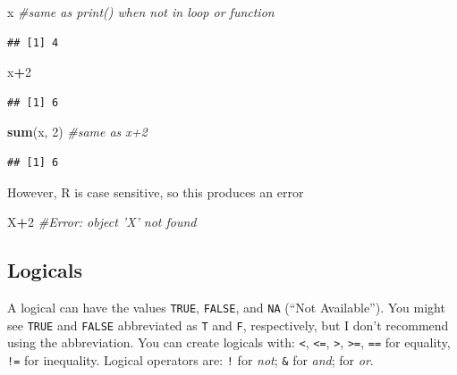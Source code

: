 \documentclass[]{article}
\newenvironment{Shaded}{\begin{snugshade}}{\end{snugshade}}
\newcommand{\KeywordTok}[1]{\textcolor[rgb]{0.13,0.29,0.53}{\textbf{#1}}}
\newcommand{\DecValTok}[1]{\textcolor[rgb]{0.00,0.00,0.81}{#1}}
\newcommand{\CommentTok}[1]{\textcolor[rgb]{0.56,0.35,0.01}{\textit{#1}}}
\newcommand{\OperatorTok}[1]{\textcolor[rgb]{0.81,0.36,0.00}{\textbf{#1}}}
\newcommand{\NormalTok}[1]{#1}
\begin{document}
\begin{Shaded}
\begin{Highlighting}[]
\NormalTok{x }\CommentTok{#same as print() when not in loop or function}
\end{Highlighting}
\end{Shaded}

\begin{verbatim}
## [1] 4
\end{verbatim}

\begin{Shaded}
\begin{Highlighting}[]
\NormalTok{x}\OperatorTok{+}\DecValTok{2}
\end{Highlighting}
\end{Shaded}

\begin{verbatim}
## [1] 6
\end{verbatim}

\begin{Shaded}
\begin{Highlighting}[]
\KeywordTok{sum}\NormalTok{(x, }\DecValTok{2}\NormalTok{) }\CommentTok{#same as x+2}
\end{Highlighting}
\end{Shaded}

\begin{verbatim}
## [1] 6
\end{verbatim}

However, R is case sensitive, so this produces an error

\begin{Shaded}
\begin{Highlighting}[]
\NormalTok{X}\OperatorTok{+}\DecValTok{2} \CommentTok{#Error: object 'X' not found}
\end{Highlighting}
\end{Shaded}

\subsection{Logicals}\label{logicals}

A logical can have the values \texttt{TRUE}, \texttt{FALSE}, and
\texttt{NA} (``Not Available''). You might see \texttt{TRUE} and
\texttt{FALSE} abbreviated as \texttt{T} and \texttt{F}, respectively,
but I don't recommend using the abbreviation. You can create logicals
with: \texttt{\textless{}}, \texttt{\textless{}=},
\texttt{\textgreater{}}, \texttt{\textgreater{}=}, \texttt{==} for
equality, \texttt{!=} for inequality. Logical operators are: \texttt{!}
for \emph{not}; \texttt{\&} for \emph{and}; \texttt{\textbar{}} for
\emph{or}.
\end{document}
